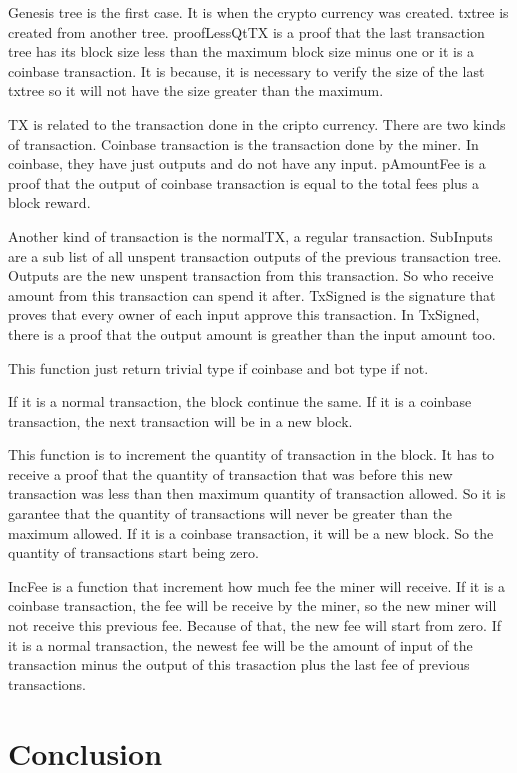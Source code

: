 \documentclass[12pt]{article}
\begin{document}
Genesis tree is the first case.
It is when the crypto currency was created.
txtree is created from another tree.
proofLessQtTX is a proof that the last transaction tree has its block size less than the maximum block size minus one or it is a coinbase transaction.
It is because, it is necessary to verify the size of the last txtree so it will not have the size greater than the maximum.


TX is related to the transaction done in the cripto currency.
There are two kinds of transaction.
Coinbase transaction is the transaction done by the miner.
In coinbase, they have just outputs and do not have any input.
pAmountFee is a proof that the output of coinbase transaction is equal to the total fees plus
a block reward.

Another kind of transaction is the normalTX, a regular transaction.
SubInputs are a sub list of all unspent transaction outputs of the previous transaction tree.
Outputs are the new unspent transaction from this transaction.
So who receive amount from this transaction can spend it after.
TxSigned is the signature that proves that every owner of each input approve this transaction.
In TxSigned, there is a proof that the output amount is greather than the input amount too.


This function just return trivial type if coinbase and bot type if not.


If it is a normal transaction, the block continue the same.
If it is a coinbase transaction, the next transaction will be in a new block.


This function is to increment the quantity of transaction in the block.
It has to receive a proof that the quantity of transaction that was before this new transaction was
less than then maximum quantity of transaction allowed.
So it is garantee that the quantity of transactions will never be greater than the maximum allowed.
If it is a coinbase transaction, it will be a new block.
So the quantity of transactions start being zero.


IncFee is a function that increment how much fee the miner will receive.
If it is a coinbase transaction, the fee will be receive by the miner, so the new miner will not receive
this previous fee.
Because of that, the new fee will start from zero.
If it is a normal transaction, the newest fee will be the amount of input of the transaction minus
the output of this trasaction plus the last fee of previous transactions.


\section{Conclusion}

\newpage
 


\end{document}
